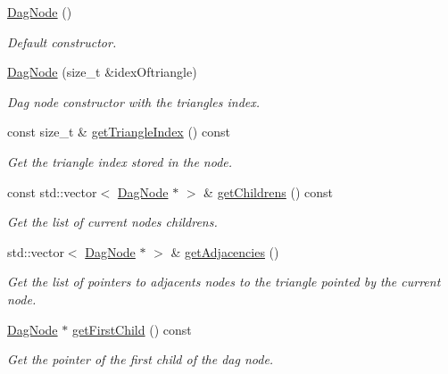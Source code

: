 \begin{DoxyCompactItemize}
\item 
\mbox{\label{classDagNode_a4ed19a5e9d5ada51128fcc181f9830ae}} 
\hyperlink{classDagNode_a4ed19a5e9d5ada51128fcc181f9830ae}{Dag\+Node} ()
\begin{DoxyCompactList}\small\item\em Default constructor. \end{DoxyCompactList}\item 
\hyperlink{classDagNode_ad44cf14086cd653ba9ede6762da32e83}{Dag\+Node} (size\+\_\+t \&idex\+Oftriangle)
\begin{DoxyCompactList}\small\item\em Dag node constructor with the triangle\textquotesingle{}s index. \end{DoxyCompactList}\item 
const size\+\_\+t \& \hyperlink{classDagNode_a5ff9ecbb6e1a5008c5b833afc8f08bab}{get\+Triangle\+Index} () const
\begin{DoxyCompactList}\small\item\em Get the triangle index stored in the node. \end{DoxyCompactList}\item 
const std\+::vector$<$ \hyperlink{classDagNode}{Dag\+Node} $\ast$ $>$ \& \hyperlink{classDagNode_a9da177349ffbfc980455d9ceae277d23}{get\+Childrens} () const
\begin{DoxyCompactList}\small\item\em Get the list of current node\textquotesingle{}s childrens. \end{DoxyCompactList}\item 
std\+::vector$<$ \hyperlink{classDagNode}{Dag\+Node} $\ast$ $>$ \& \hyperlink{classDagNode_abc1bd7d5b2a39d85cd7bd924cdc984b3}{get\+Adjacencies} ()
\begin{DoxyCompactList}\small\item\em Get the list of pointers to adjacents nodes to the triangle pointed by the current node. \end{DoxyCompactList}\item 
\hyperlink{classDagNode}{Dag\+Node} $\ast$ \hyperlink{classDagNode_a35869cdb3ff3900d2ed4366270a39b83}{get\+First\+Child} () const
\begin{DoxyCompactList}\small\item\em Get the pointer of the first child of the dag node. \end{DoxyCompactList}\item 

\end{DoxyCompactItemize}
